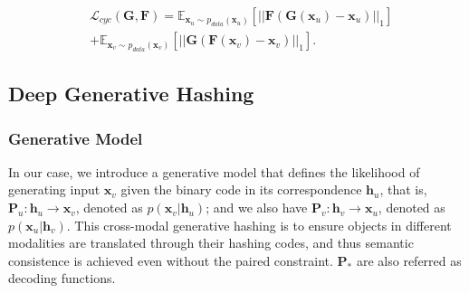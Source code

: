 \documentclass[10pt,journal,twocolumn]{IEEEtran}
\begin{document}
\begin{equation}\label{eq:cycle-loss}
\begin{split}
     &   \mathcal{L}_{cyc}(\boldsymbol G,\boldsymbol F)=\mathbb{E}_{\boldsymbol x_u \sim p_{data} (\boldsymbol x_u)} \left[ || \boldsymbol F(\boldsymbol G(\boldsymbol x_u) - \boldsymbol x_u)||_1\right] \\
     &  + \mathbb{E}_{\boldsymbol x_v \sim p_{data} (\boldsymbol x_v)} \left[ || \boldsymbol G(\boldsymbol F(\boldsymbol x_v) - \boldsymbol x_v)||_1\right].
\end{split}
\end{equation}



\subsection{Deep Generative Hashing}

\subsubsection{Generative Model}
In our case, we introduce a generative model that defines the likelihood of generating input $\boldsymbol x_v$ given the binary code in its correspondence $\boldsymbol h_u$, that is, $\boldsymbol P_u: \boldsymbol h_u \rightarrow \boldsymbol x_v$, denoted as $p(\boldsymbol x_v| \boldsymbol h_u)$; and we also have $\boldsymbol P_v: \boldsymbol h_v \rightarrow \boldsymbol x_u$, denoted as $p(\boldsymbol x_u| \boldsymbol h_v)$. This cross-modal generative hashing is to ensure objects in different modalities are translated through their hashing codes, and thus semantic consistence is achieved even without the paired constraint. $\boldsymbol P_\ast$ are also referred as decoding functions.
\end{document}
